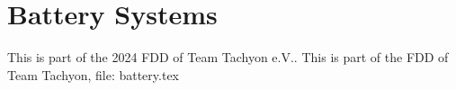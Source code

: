 \section{Battery Systems}

This is part of the 2024 FDD of Team Tachyon e.V..
This is part of the FDD of Team Tachyon, file: battery.tex
